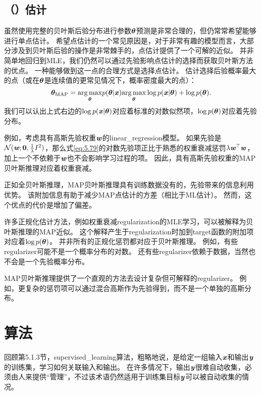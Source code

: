 \subsection{（）估计}
\label{sec:maximum_a_posteriori_estimation}
虽然使用完整的贝叶斯后验分布进行参数$\boldsymbol{\theta}$预测是非常合理的，但仍常常希望能够进行单点估计。
希望点估计的一个常见原因是，对于非常有趣的模型而言，大部分涉及到贝叶斯后验的操作是非常棘手的，点估计提供了一个可解的近似。
并非简单地回归到\gls{MLE}，我们仍然可以通过先验影响点估计的选择而获取贝叶斯方法的优点。
一种能够做到这一点的合理方式是选择点估计。
估计选择后验概率最大的点（或在$\boldsymbol{\theta}$是连续值的更常见情况下，概率密度最大的点）：
\begin{equation}
\label{eq:5.79}
    \boldsymbol{\theta}_{\text{MAP}} = \underset{\boldsymbol{\theta}}{\arg\max} p(\boldsymbol{\theta}|\boldsymbol{\mathit{x}})
    \underset{\boldsymbol{\theta}}{\arg\max} \log p(\boldsymbol{\mathit{x}} | \boldsymbol{\theta}) + \log p(\boldsymbol{\theta}) .
\end{equation}
我们可以认出上式右边的$\log p(\boldsymbol{\mathit{x}} | \boldsymbol{\theta})$对应着标准的对数似然项，$\log p(\boldsymbol{\theta})$对应着先验分布。


例如，考虑具有高斯先验权重$\boldsymbol{\mathit{w}}$的\gls{linear_regression}模型。
如果先验是$\mathcal{N}(\boldsymbol{\mathit{w}};\mathbf{0},\frac{1}{\lambda}I^2)$，那么式\ref{eq:5.79}的对数先验项正比于熟悉的权重衰减惩罚$\lambda \boldsymbol{\mathit{w}}^\top\boldsymbol{\mathit{w}}$，加上一个不依赖于$\boldsymbol{\mathit{w}}$也不会影响学习过程的项。
因此，具有高斯先验权重的\gls{MAP}贝叶斯推理对应着权重衰减。

正如全贝叶斯推理，\gls{MAP}贝叶斯推理具有训练数据没有的，先验带来的信息利用优势。
该附加信息有助于减少\gls{MAP}点估计的方差（相比于ML估计）。
然而，这个优点的代价是增加了偏差。

许多正规化估计方法，例如权重衰减\gls{regularization}的\gls{MLE}学习，可以被解释为贝叶斯推理的\gls{MAP}近似。
这个解释产生于\gls{regularization}时加到\gls{target}函数的附加项对应着$\log p(\boldsymbol{\theta})$。
并非所有的正规化惩罚都对应于贝叶斯推理。
例如，有些\gls{regularizer}可能不是一个概率分布的对数。
还有些\gls{regularizer}依赖于数据，当然也不会是一个先验概率分布。

\gls{MAP}贝叶斯推理提供了一个直观的方法去设计复杂但可解释的\gls{regularizer}。
例如，更复杂的惩罚项可以通过混合高斯作为先验得到，而不是一个单独的高斯分布\citep{Nowlan-nips92}。

\section{算法}
\label{sec:supervised_learning_algorithms}
回顾第5.1.3节，\gls{supervised_learning}算法，粗略地说，是给定一组输入$\boldsymbol{\mathit{x}}$和输出$\boldsymbol{\mathit{y}}$的训练集，学习如何关联输入和输出。
在许多情况下，输出$\boldsymbol{\mathit{y}}$很难自动收集，必须由人来提供“管理”，不过该术语仍然适用于训练集目标$\boldsymbol{\mathit{y}}$可以被自动收集的情况。

